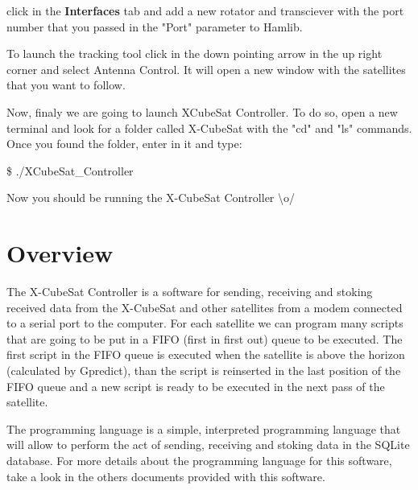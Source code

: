 \documentclass[pdftex,11pt,a4paper,titlepage]{report}
\begin{document}
click in the \textbf{Interfaces} tab and add a new rotator and transciever with the port number that you passed in the "Port" parameter to Hamlib. 

To launch the tracking tool click in the down pointing arrow in the up right corner and select Antenna Control. It will open a new window with the satellites that you want to follow. 

Now, finaly we are going to launch XCubeSat Controller. To do so, open a new terminal and look for a folder called X-CubeSat with the "cd" and "ls" commands. Once you found the folder, enter in it and type:
\begin{framed}
\$ ./XCubeSat\_Controller
\end{framed}

Now you should be running the X-CubeSat Controller \textbackslash o/

\chapter{Overview}
\hspace{0.4cm} The X-CubeSat Controller is a software for sending, receiving and stoking received data from the X-CubeSat and other satellites from a modem connected to a serial port to the computer. For each satellite we can program many scripts that are going to be put in a FIFO (first in first out) queue to be executed. The first script in the FIFO queue is executed when the satellite is above the horizon (calculated by Gpredict), than the script is reinserted in the last position of the FIFO queue and a new script is ready to be executed in the next pass of the satellite. 

The programming language is a simple, interpreted programming language that will allow to perform the act of sending, receiving and stoking data in the SQLite database. For more details about the programming language for this software, take a look in the others documents provided with this software. 
\end{document}

